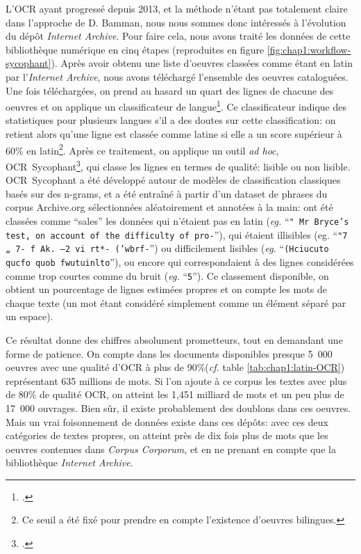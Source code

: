 L'OCR ayant progressé depuis 2013, et la méthode n'étant pas totalement claire dans l'approche de D. Bamman, nous nous sommes donc intéressés à l'évolution du dépôt \textit{Internet Archive}. Pour faire cela, nous avons traité les données de cette bibliothèque numérique en cinq étapes (reproduites en figure \ref{fig:chap1:workflow-sycophant}). Après avoir obtenu une liste d'oeuvres classées comme étant en latin par l'\textit{Internet Archive}, nous avons téléchargé l'ensemble des oeuvres cataloguées. Une fois téléchargées, on prend au hasard un quart des lignes de chacune des oeuvres et on applique un classificateur de langue\footcite{salcianu2018compact}. Ce classificateur indique des statistiques pour plusieurs langues s'il a des doutes sur cette classification: on retient alors qu'une ligne est classée comme latine si elle a un score supérieur à 60\% en latin\footnote{Ce seuil a été fixé pour prendre en compte l'existence d'oeuvres bilingues.}. Après ce traitement, on applique un outil \textit{ad hoc}, OCR~Sycophant\footcite{Clerice_OCR_Sycophant_2021}, qui classe les lignes en termes de qualité: lisible ou non lisible. OCR~Sycophant a été développé autour de modèles de classification classiques basés sur des n-grams, et a été entraîné à partir d'un dataset de phrases du corpus Archive.org sélectionnées aléatoirement et annotées à la main: ont été classées comme ``sales'' les données qui n'étaient pas en latin (\textit{eg.} ``\texttt{" Mr Bryce's test, on account of the difficulty of pro-}''), qui étaient illisibles (eg. ``\texttt{"7 „ 7- f Ak. —2 vi rt*- ('wbrf-}'') ou difficilement lisibles (\textit{eg.} ``\texttt{(Hciucuto qucfo quob fwutuinlto}''), ou encore qui correspondaient à des lignes considérées comme trop courtes comme du bruit (\textit{eg.} ``\texttt{5}''). Ce classement disponible, on obtient un pourcentage de lignes estimées propres et on compte les mots de chaque texte (un mot étant considéré simplement comme un élément séparé par un espace).

Ce résultat donne des chiffres absolument prometteurs, tout en demandant une forme de patience. On compte dans les documents disponibles presque 5~000 oeuvres avec une qualité d'OCR à plus de 90\%(\textit{cf.} table \ref{tab:chap1:latin-OCR}) représentant 635 millions de mots. Si l'on ajoute à ce corpus les textes avec plus de 80\% de qualité OCR, on atteint les 1,451 milliard de mots et un peu plus de 17~000 ouvrages. Bien sûr, il existe probablement des doublons dans ces oeuvres. Mais un vrai foisonnement de données existe dans ces dépôts: avec ces deux catégories de textes propres, on atteint près de dix fois plus de mots que les oeuvres contenues dans \textit{Corpus Corporum}, et en ne prenant en compte que la bibliothèque \textit{Internet Archive}.

